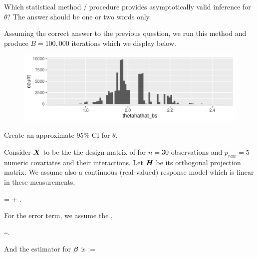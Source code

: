 \documentclass[12pt]{article}
\begin{document}
\begin{enumerate}[(a)]
 Which statistical method / procedure provides asymptotically valid inference for $\theta$? The answer should be one or two words only. 

Assuming the correct answer to the previous question, we run this method and produce $B = 100,000$ iterations which we display below. 

\vspace{-0.2cm}
\begin{figure}[htp]
\centering
\includegraphics[width=6.0in]{bootstraps}
\end{figure}
\FloatBarrier
\vspace{-0.7cm}

 Create an approximate 95\% CI for $\theta$. 


\end{enumerate}

\problem Consider $\boldsymbol{X}$ to be the the design matrix of for $n = 30$ observations and $p_{raw} = 5$ numeric covariates and their interactions. Let $\boldsymbol{H}$ be its orthogonal projection matrix. We assume also a continuous (real-valued) response model which is linear in these measurements,

\vspace{-0.2cm}
\beqn
\Y = \X\bbeta + \berrorrv.
\eeqn

\noindent For the error term, we assume the ,

\vspace{-0.2cm}
\beqn
\berrorrv \sim {}.
\eeqn

\noindent And the estimator for $\boldsymbol{\beta}$ is
\beqn
\B := \XtXinvXt \Y 
\eeqn
\end{document}

